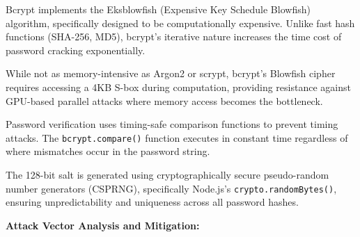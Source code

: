 \documentclass[12pt,a4paper]{article}
\begin{document}
\begin{tcolorbox}[colback=primaryblue!5, colframe=primaryblue, boxrule=1pt, arc=3pt, left=10pt, right=10pt, top=8pt, bottom=8pt]
\begin{description}[leftmargin=2em, itemsep=8pt, style=nextline]
    \item[\textbf{Key Stretching Mechanics:}] Bcrypt implements the Eksblowfish (Expensive Key Schedule Blowfish) algorithm, specifically designed to be computationally expensive. Unlike fast hash functions (SHA-256, MD5), bcrypt's iterative nature increases the time cost of password cracking exponentially.
    
    \item[\textbf{Memory-Hard Properties:}] While not as memory-intensive as Argon2 or scrypt, bcrypt's Blowfish cipher requires accessing a 4KB S-box during computation, providing resistance against GPU-based parallel attacks where memory access becomes the bottleneck.
    
    \item[\textbf{Constant-Time Comparison:}] Password verification uses timing-safe comparison functions to prevent timing attacks. The \texttt{bcrypt.compare()} function executes in constant time regardless of where mismatches occur in the password string.
    
    \item[\textbf{Salt Generation Entropy:}] The 128-bit salt is generated using cryptographically secure pseudo-random number generators (CSPRNG), specifically Node.js's \texttt{crypto.randomBytes()}, ensuring unpredictability and uniqueness across all password hashes.
\end{description}

\vspace{0.5em}

\textbf{Attack Vector Analysis and Mitigation:}


\end{tcolorbox}
\end{document}
